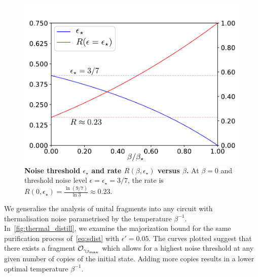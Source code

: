 \documentclass[pra,
aps,
twocolumn,
superscriptaddress,
groupedaddress,
nofootinbib,
reprint
]{revtex4-1}
\begin{document}
\begin{figure}[h]
    \centering
    \includegraphics[scale=0.5]{figs/noise_threshold.pdf}
    \caption{\textbf{Noise threshold $\epsilon_\star$ and rate $R(\beta, \epsilon_\star)$ versus $\beta$.}
    At $\beta = 0$ and threshold noise level $\epsilon = \epsilon_\star = 3/7$, the rate is $R(0, \epsilon_\star) = \frac{\ln{(9/7)}}{\ln{3}} \approx 0.23$.
    }
    \label{fig:noise_threshold}
\end{figure}

We generalise the analysis of unital fragments into any circuit with thermalisation noise parametrised by the temperature $\beta^{-1}$.
In~\cref{fig:thermal_distill}, we examine the majorization bound for the same purification process of~\cref{eq:sdist} with $\epsilon' = 0.05$.
The curves plotted suggest that there exists a fragment $\mathcal{O}_{\gamma_{\beta_{\rm{max}}}}$ which allows for a highest noise threshold at any given number of copies of the initial state.
Adding more copies results in a lower optimal temperature $\beta^{-1}$.
\end{document}
